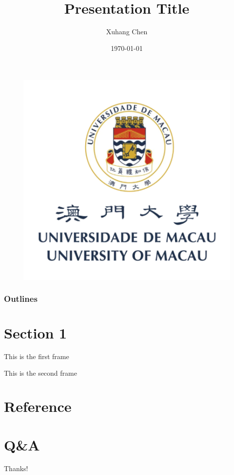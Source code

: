 \documentclass{beamer}
\author{Xuhang Chen}
\title{Presentation Title}
\institute{FST, Univeristy of Macau}
\date{\today}
\begin{document}
\begin{frame}
    \titlepage
    \begin{figure}[htpb]
        \begin{center}
            \includegraphics[width=0.2\linewidth]{pic/um_red.png}
        \end{center}
    \end{figure}
\end{frame}

\begin{frame}
    \frametitle{Outlines}
    \tableofcontents[sectionstyle=show,subsectionstyle=show/shaded/hide,subsubsectionstyle=show/shaded/hide]
\end{frame}


\section{Section 1}

\begin{frame}
    This is the first frame
\end{frame}

\begin{frame}
    This is the second frame
\end{frame}

\section*{Reference}

\begin{frame}[allowframebreaks]
    
    
\end{frame}

\section*{Q\&A}

\begin{frame}
    \begin{center}
        {\Huge\calligra Thanks!}
    \end{center}
\end{frame}
\end{document}
